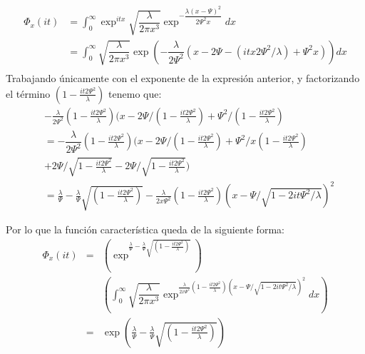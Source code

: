 \begin{equation}
	\begin{split} \label{211}
		\Phi_{x}(it)& =\int_{0}^{\infty}\exp^{itx}\sqrt{\dfrac{\lambda}{2\pi x^{3}}}\exp^{-\dfrac{\lambda(x-\Psi)^{2}}{2\Psi^{2}x}}dx\\
		&=\int_{0}^{\infty}\sqrt{\dfrac{\lambda}{2\pi x^{3}}}\exp(-\dfrac{\lambda}{2\Psi^{2}}(x-2\Psi-(itx2\Psi^{2}/\lambda)+\Psi^{2}x))dx\\
	\end{split}
\end{equation}
Trabajando únicamente con el exponente de la expresión anterior, y factorizando el término
$(1-\frac{it2\Psi^{2}}{\lambda})$ tenemo que:
\begin{equation} \label{212}
	\begin{split}
		&-\frac{\lambda}{2\Psi^{2}}(1-\frac{it2\Psi^{2}}{\lambda})
		(x-2\Psi/(1-\frac{it2\Psi^{2}}{\lambda})
		+\Psi^{2}/(1-\frac{it2\Psi^{2}}\lambda)\\ 
		&=-\dfrac{\lambda}{2\Psi^{2}}(1-\frac{it2\Psi^{2}}{\lambda})(x-2\Psi/(1-\frac{it2\Psi^{2}}{\lambda})
		+\Psi^{2}/x(1-\frac{it2\Psi^{2}}{\lambda})\\
		&+2\Psi/\sqrt{1-\frac{it2\Psi^{2}}{\lambda}}
		-2\Psi/\sqrt{1-\frac{it2\Psi^{2}}{\lambda}})\\
		&=\frac{\lambda}{\Psi}-\frac{\lambda}{\Psi}\sqrt{(1-\frac{it2\Psi^{2}}{\lambda})}-
		\frac{\lambda}{2x\Psi^{2}}(1-\frac{it2\Psi^{2}}{\lambda})(x
		-\Psi/\sqrt{1-2it\Psi^{2}/\lambda})^{2}
	\end{split}
\end{equation}

Por lo que la función característica queda de la siguiente forma:
\begin{eqnarray*}
\Phi_{x}(it) & =& (\exp^{\frac{\lambda}{\Psi}-\frac{\lambda}{\Psi}\sqrt{(1-\frac{it2\Psi^{2}}{\lambda})}}) \\
& &(\int_{0}^{\infty}\sqrt{\dfrac{\lambda}{2\pi x^{3}}}\exp^{\frac{\lambda}{2x\Psi^{2}}(1-\frac{it2\Psi^{2}}{\lambda})(x
	-\Psi/\sqrt{1-2it\Psi^{2}/\lambda})^{2}}dx)\\
&=&\exp(\frac{\lambda}{\Psi}-\frac{\lambda}{\Psi}\sqrt{(1-\frac{it2\Psi^{2}}{\lambda})})\\
\end{eqnarray*}



